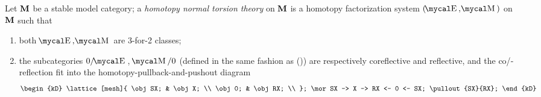 \begin{definition}
Let $\textbf{M}$ be a stable model category; a \emph{homotopy normal torsion theory} on $\textbf{M}$ is a homotopy factorization system $(\EE,\MM)$ on $\textbf{M}$ such that 
\begin{enumerate}
\item both $\EE,\MM$ are 3\hyp{}for\hyp{}2 classes;
\item the subcategories $0/\EE$, $\MM/0$ (defined in the same fashion as ()) are respectively coreflective and reflective, and the co\fshyp{}reflection fit into the homotopy\hyp{}pullback\hyp{}and\hyp{}pushout diagram
\[
\begin{kD}
\lattice[mesh]{
	\obj SX; & \obj X; \\
	\obj 0; & \obj RX; \\
};
\mor SX -> X -> RX <- 0 <- SX;
\pullout{SX}{RX};
\end{kD}
\]
\end{enumerate}
\end{definition}

